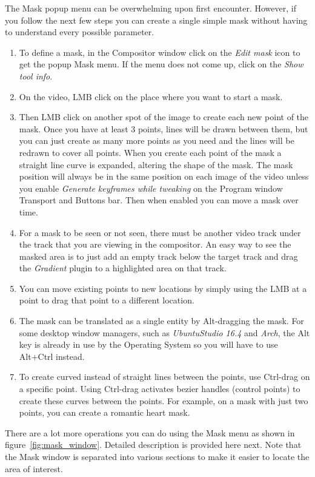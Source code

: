 The Mask popup menu can be overwhelming upon first encounter.  However, if you follow the next
few steps you can create a single simple mask without having to understand every possible parameter.
\begin{enumerate}
    \item To define a mask, in the Compositor window click on the \textit{Edit mask} icon to get the popup Mask menu.  If the menu does not come up, click on the \textit{Show tool info}.
    \item  On the video, LMB click on the place where you want to start a mask.
    \item  Then LMB click on another spot of the image to create each new point of the mask. Once
you have at least 3 points, lines will be drawn between them, but you can just create as many
more points as you need and the lines will be redrawn to cover all points. When you 
create each point of the mask a straight line curve is expanded, altering the shape of the mask.
The mask position will always be in the same position on each image of the video unless you enable 
\textit{Generate keyframes while tweaking} on the Program window Transport and Buttons bar. Then when 
enabled you can move a mask over time.
     \item For a mask to be seen or not seen, there must be another video track under the track
that you are viewing in the compositor.  An easy way to see the masked area is to just add an empty track
below the target track and drag the \textit{Gradient} plugin to a highlighted area on that track.
     \item  You can move existing points to new locations by simply using the LMB at a point to
drag that point to a different location.
    \item  The mask can be translated as a single entity by Alt-dragging the mask.  For some desktop
window managers, such as \textit{UbuntuStudio 16.4} and \textit{Arch}, the Alt key is already in use
by the Operating System so you will have to use Alt+Ctrl instead.
    \item To create curved instead of straight lines between the points, use  Ctrl-drag on a
specific point. Using Ctrl-drag activates bezier handles (control points) to create these curves
between the points. For example, on a mask with just two points, you can create a romantic heart mask.     
\end{enumerate}

There are a lot more operations you can do using the Mask menu as shown in 
figure~\ref{fig:mask_window}.  Detailed description is provided here next.  Note that the Mask
window is separated into various sections to make it easier to locate the area of interest.

